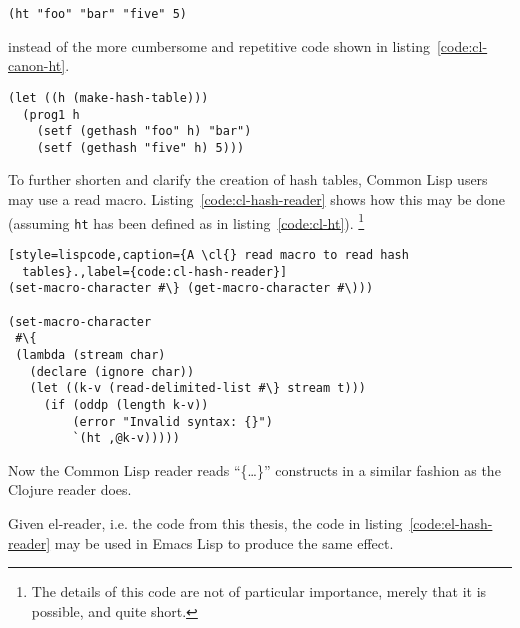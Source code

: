 \documentclass[a4paper,10pt,twoside]{report}
\newcommand{\el}{Emacs Lisp}
\newcommand{\cl}{Common Lisp}
\newcommand{\elr}{el-reader}
\newcommand{\fun}[1]{\texttt{#1}}
\begin{document}

\begin{lstlisting}[style=lispinline]
(ht "foo" "bar" "five" 5)
\end{lstlisting}


instead of the more cumbersome and repetitive code shown in
listing~\ref{code:cl-canon-ht}.


\begin{lstlisting}[style=lispcode,caption={Canonical way to create a hash
  table.},label={code:cl-canon-ht}]
(let ((h (make-hash-table)))
  (prog1 h
    (setf (gethash "foo" h) "bar")
    (setf (gethash "five" h) 5)))
\end{lstlisting}

To further shorten and clarify the creation of hash tables, \cl{} users may use
a read macro. Listing~\ref{code:cl-hash-reader} shows how this may be done
(assuming \fun{ht} has been defined as in listing~\ref{code:cl-ht}).
\footnote{The details of this code are not of particular importance, merely that
  it is possible, and quite short.}

\pagebreak

\begin{lstlisting}[style=lispcode,caption={A \cl{} read macro to read hash
  tables}.,label={code:cl-hash-reader}]
(set-macro-character #\} (get-macro-character #\)))

(set-macro-character
 #\{
 (lambda (stream char)
   (declare (ignore char))
   (let ((k-v (read-delimited-list #\} stream t)))
     (if (oddp (length k-v))
         (error "Invalid syntax: {}")
         `(ht ,@k-v)))))
\end{lstlisting}

Now the \cl{} reader reads ``\{\ldots{}\}'' constructs in a similar fashion as
the Clojure reader does.

Given \elr{}, i.e. the code from this thesis, the code in
listing~\ref{code:el-hash-reader} may be used in \el{} to produce the same
effect.
\end{document}
